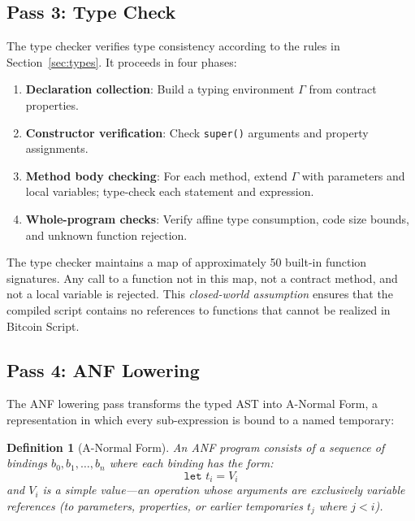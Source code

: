 \documentclass[11pt,a4paper]{article}
\newtheorem{definition}[theorem]{Definition}
\begin{document}
\subsection{Pass 3: Type Check}
\label{sec:pass-typecheck}

The type checker verifies type consistency according to the rules in
Section~\ref{sec:types}. It proceeds in four phases:

\begin{enumerate}[nosep]
  \item \textbf{Declaration collection}: Build a typing environment $\Gamma$
    from contract properties.
  \item \textbf{Constructor verification}: Check \texttt{super()} arguments
    and property assignments.
  \item \textbf{Method body checking}: For each method, extend $\Gamma$ with
    parameters and local variables; type-check each statement and expression.
  \item \textbf{Whole-program checks}: Verify affine type consumption,
    code size bounds, and unknown function rejection.
\end{enumerate}

The type checker maintains a map of approximately 50 built-in function
signatures. Any call to a function not in this map, not a contract method,
and not a local variable is rejected. This \emph{closed-world assumption}
ensures that the compiled script contains no references to functions that
cannot be realized in Bitcoin Script.

\subsection{Pass 4: ANF Lowering}
\label{sec:pass-anf}

The ANF lowering pass transforms the typed AST into A-Normal Form, a
representation in which every sub-expression is bound to a named temporary:

\begin{definition}[A-Normal Form]
An ANF program consists of a sequence of \emph{bindings} $b_0, b_1, \ldots, b_n$
where each binding has the form:
\[
  \texttt{let } t_i = V_i
\]
and $V_i$ is a \emph{simple value}---an operation whose arguments are
exclusively variable references (to parameters, properties, or earlier
temporaries $t_j$ where $j < i$).
\end{definition}
\end{document}
